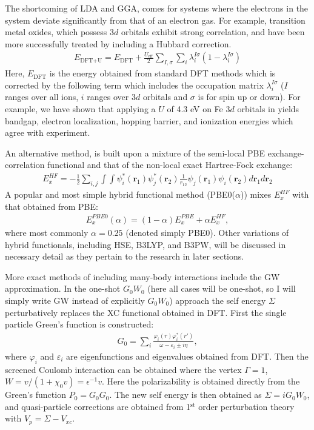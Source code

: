 The shortcoming of LDA and GGA, comes for systems where the electrons in the system deviate significantly from that of an electron gas. For example, transition metal oxides, which possess $3d$ orbitals exhibit strong correlation, and have been more successfully treated by including a Hubbard correction.~\cite{dudarev1998electron}
\begin{align}
    E_{\text{DFT}+\text{U}}=E_{\text{DFT}}+\frac{U_{\text{eff}}}{2}\sum_{I,\sigma}\sum_{i}\lambda_{i}^{I\sigma}(1-\lambda_{i}^{I\sigma})
    \label{intro:eq:U}
\end{align}
Here, $E_\text{DFT}$ is the energy obtained from standard DFT methods which is corrected by the following term which includes the occupation matrix $\lambda_i^{I\sigma}$ ($I$ ranges over all ions, $i$ ranges over $3d$ orbitals and $\sigma$ is for spin up or down). For example, we have shown that applying a $U$ of 4.3 eV on Fe $3d$ orbitals in  yields bandgap, electron localization, hopping barrier, and ionization energies which agree with experiment.~\cite{smart2017effect}

An alternative method, is built upon a mixture of the semi-local PBE exchange-correlation functional and that of the non-local exact Hartree-Fock exchange:
\begin{align}
    E_x^{HF} = -\frac{1}{2} \sum_{i,j} \int\int \psi_i^*(\textbf{r}_1)\psi_j^*(\textbf{r}_2) \frac{1}{r_{12}} \psi_j(\textbf{r}_1)\psi_i(\textbf{r}_2) d\textbf{r}_1 d\textbf{r}_2
    \label{intro:eq:HF}
\end{align}
A popular and most simple hybrid functional method (PBE0($\alpha$)) mixes $E_x^{HF}$ with that obtained from PBE:
\begin{align}
    E_{x}^{PBE0}(\alpha) = (1-\alpha) E_x^{PBE} + \alpha E_x^{HF},
    \label{intro:eq:PBE0a}
\end{align}
where most commonly $\alpha=0.25$ (denoted simply PBE0). Other variations of hybrid functionals, including HSE, B3LYP, and B3PW, will be discussed in necessary detail as they pertain to the research in later sections.


More exact methods of including many-body interactions include the GW approximation. In the one-shot $G_0W_0$ (here all cases will be one-shot, so I will simply write GW instead of explicitly $G_0W_0$) approach the self energy $\Sigma$ perturbatively replaces the XC functional obtained in DFT. First the single particle Green's function is constructed:
\begin{align}
    G_0 = \sum_i \frac{\varphi_i(r)\varphi_i^*(r')}{\omega-\varepsilon_i \pm i\eta },
    \label{intro:eq:g0}
\end{align}
where $\varphi_i$ and $\varepsilon_i$ are eigenfunctions and eigenvalues obtained from DFT. Then the screened Coulomb interaction can be obtained where the vertex $\Gamma = 1$, $W = v/(1+\chi_0 v) = \epsilon^{-1} v$. Here the polarizability is obtained directly from the Green's function $P_0=G_0G_0$. The new self energy is then obtained as $\Sigma = iG_0W_0$, and quasi-particle corrections are obtained from 1$^\text{st}$ order perturbation theory with $V_p = \Sigma - V_{xc}$.



